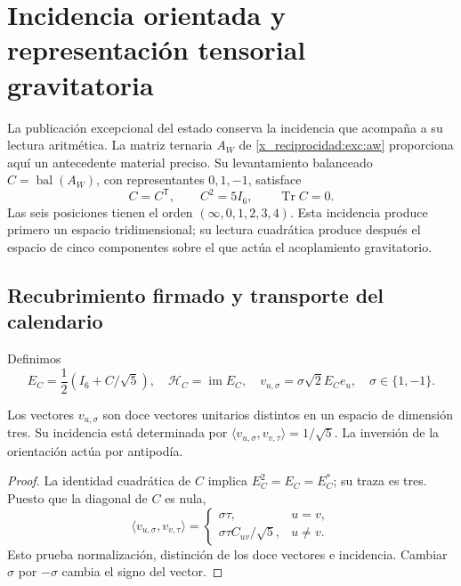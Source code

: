\chapter{Incidencia orientada y representación tensorial gravitatoria}
\label{x_reciprocidad:vii:sec:pentacomponente}
La publicación excepcional del estado conserva la incidencia que acompaña
a su lectura aritmética. La matriz ternaria \(A_W\) de
\eqref{x_reciprocidad:exc:aw} proporciona aquí un antecedente material preciso. Su
levantamiento balanceado \(C=\operatorname{bal}(A_W)\), con representantes
\(0,1,-1\), satisface
\[
 C=C^{\mathsf T},\qquad C^2=5I_6,\qquad \operatorname{Tr}C=0.
\]
Las seis posiciones tienen el orden \((\infty,0,1,2,3,4)\).
Esta incidencia produce primero un espacio tridimensional; su lectura
cuadrática produce después el espacio de cinco componentes sobre el que
actúa el acoplamiento gravitatorio.

\section{Recubrimiento firmado y transporte del calendario}
Definimos
\[
 E_C=\frac12(I_6+C/\sqrt5),\quad
 \mathcal H_C=\operatorname{im}E_C,\quad
 v_{u,\sigma}=\sigma\sqrt2E_Ce_u,\quad \sigma\in\{1,-1\}.
\]
\begin{proposition}
\label{x_reciprocidad:vii:prop:doce-orientadas}
Los vectores \(v_{u,\sigma}\) son doce vectores unitarios distintos
en un espacio de dimensión tres. Su incidencia está determinada por
\(\langle v_{u,\sigma},v_{v,\tau}\rangle=1/\sqrt5\).
La inversión de la orientación actúa por antipodía.
\end{proposition}
\begin{proof}
La identidad cuadrática de \(C\) implica \(E_C^2=E_C=E_C^*\);
su traza es tres. Puesto que la diagonal de \(C\) es nula,
\[
 \langle v_{u,\sigma},v_{v,\tau}\rangle
 =\begin{cases}\sigma\tau,&u=v,\\
 \sigma\tau C_{uv}/\sqrt5,&u\ne v.
 \end{cases}
\]
Esto prueba normalización, distinción de los doce vectores e incidencia.
Cambiar \(\sigma\) por \(-\sigma\) cambia el signo del vector.
\end{proof}

